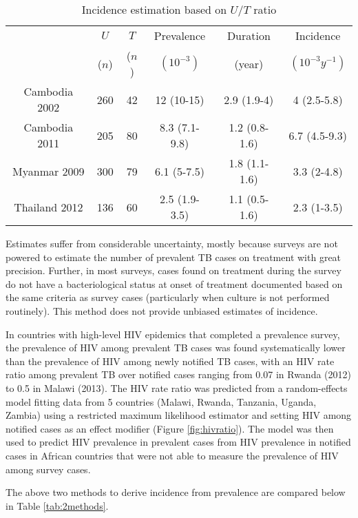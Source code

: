 \begin{table}
\label{tab:method2}
    \begin{tabular}{ c c c c c c }
    \hline
         & $U$ & $T$ & Prevalence & Duration & Incidence \\ 
         &  ($n$)   & ($n$)    & $(10^{-3})$ & (year)    & $(10^{-3}y^{-1})$ \\
     \hline
        Cambodia 2002 & 260 & 42 & 12 (10-15) & 2.9 (1.9-4) & 4 (2.5-5.8) \\ 
        Cambodia 2011 & 205 & 80 & 8.3 (7.1-9.8) & 1.2 (0.8-1.6) & 6.7 (4.5-9.3) \\ 
        Myanmar 2009 & 300 & 79 & 6.1 (5-7.5) & 1.8 (1.1-1.6) & 3.3 (2-4.8) \\ 
        Thailand 2012 & 136 & 60 & 2.5 (1.9-3.5) & 1.1 (0.5-1.6) & 2.3 (1-3.5) \\ 
    \hline
    \end{tabular} 
    \caption{Incidence estimation based on $U/T$ ratio
} 
\end{table}

Estimates suffer from considerable uncertainty, mostly because surveys are not powered to estimate the number of prevalent TB cases on treatment with great precision. Further, in most surveys, cases found on treatment during the survey do not have a bacteriological status at onset of treatment documented based on the same criteria as survey cases (particularly when culture is not performed routinely). This method does not provide unbiased estimates of incidence. 

In countries with high-level HIV epidemics that completed a prevalence survey, the prevalence of HIV among prevalent TB cases was found systematically lower than the prevalence of HIV among newly notified TB cases, with an HIV rate ratio among prevalent TB over notified cases ranging from 0.07 in Rwanda (2012) to 0.5 in Malawi (2013). The HIV rate ratio was predicted from a random-effects model fitting data from 5 countries (Malawi, Rwanda, Tanzania, Uganda, Zambia) using a restricted maximum likelihood estimator and setting HIV among notified cases as an effect modifier (Figure \ref{fig:hivratio}). The model was then used to predict HIV prevalence in prevalent cases from HIV prevalence in notified cases in African countries that were not able to measure the prevalence of HIV among survey cases.

The above two methods to derive incidence from prevalence are compared below in Table \ref{tab:2methods}.

